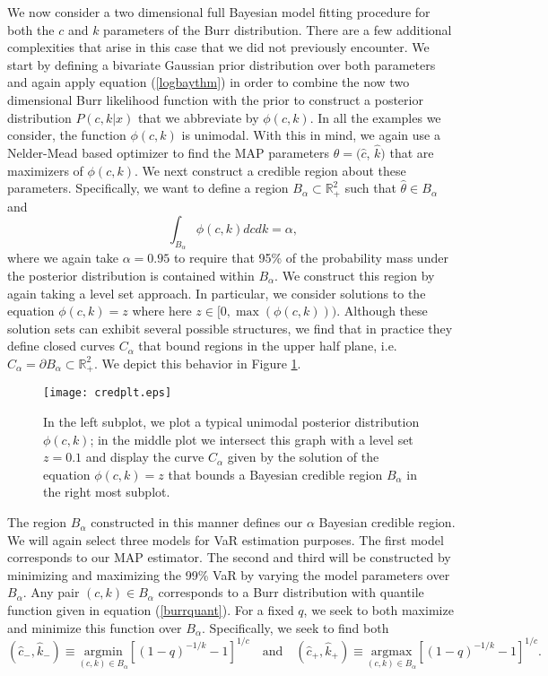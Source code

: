 \documentclass{amsart}
\begin{document}
We now consider a two dimensional full Bayesian model fitting procedure for 
both the $c$ and $k$ parameters of the Burr distribution.  There are a few additional 
complexities that arise in this case that we did not previously encounter. 
We start by defining a bivariate Gaussian prior distribution 
over both parameters and again apply equation (\ref{logbaythm}) in order to combine the now two dimensional 
Burr likelihood function with the prior to construct a 
posterior distribution $P(c,k|x)$ that we abbreviate by $\phi(c,k)$.  
In all the examples we consider, the function $\phi(c,k)$ is 
unimodal.  With this in mind, we again use a Nelder-Mead based optimizer to find the MAP 
parameters $\hat{\theta}=(\hat{c}$, $\hat{k})$ that are maximizers of $\phi(c,k)$.  We next 
construct a credible region about these parameters.  Specifically, we want 
to define a region $B_\alpha\subset\mathbb{R}^2_+$ such that $\hat{\theta}\in B_\alpha$ and 
%
\begin{equation}
    \int_{B_{\alpha}} \phi(c,k)dcdk = \alpha,
 \end{equation}
%
where we again take $\alpha=0.95$ to require that 95\% of the probability mass under the
posterior distribution is contained within $B_\alpha$. We construct this region by again taking a level set approach.  In particular, 
we consider solutions to the equation $\phi(c,k)=z$ where here 
$z\in [0,\max(\phi(c,k)))$.  Although these solution sets can exhibit several possible structures, 
we find that in practice they define closed curves $C_\alpha$ that 
bound regions in the upper half plane, i.e. $C_\alpha=\partial B_\alpha\subset\mathbb{R}^2_+$.
We depict this behavior in Figure \ref{typcrv}.
%
\begin{figure}[h!]
    \centering
    \texttt{[image: credplt.eps]}
    \caption{In the left subplot, we plot a typical unimodal posterior distribution $\phi(c,k)$; in the 
        middle plot we intersect this graph with a level set $z=0.1$ and display 
    the curve $C_\alpha$ given by the solution of the equation $\phi(c,k)=z$ that 
    bounds a Bayesian credible region $B_\alpha$  in the right most subplot.}
    \label{typcrv}
\end{figure}
%
The region $B_\alpha$ constructed in this manner defines our $\alpha$ Bayesian credible region. 
We will again select three models for VaR estimation purposes.  The first model corresponds to our 
MAP estimator.  The second and third will be constructed by minimizing and maximizing the 99\%
VaR by varying 
the model parameters over $B_\alpha$. Any pair $(c,k)\in B_\alpha$ corresponds to 
a Burr distribution with quantile function given in equation (\ref{burrquant}).  For a fixed 
$q$, we seek to both maximize and minimize this function over $B_\alpha$.  Specifically, 
we seek to find both
%
\begin{equation}
    (\hat{c}_-,\hat{k}_-) \equiv \underset{(c,k)\in B_\alpha}{\mathrm{argmin}} \left[(1-q)^{-1/k} - 1 \right]^{1/c}\quad 
    \mathrm{and}\quad
    (\hat{c}_+,\hat{k}_+) \equiv \underset{(c,k)\in B_\alpha}{\mathrm{argmax}} \left[(1-q)^{-1/k} - 1 \right]^{1/c}.
\end{equation}
%
\end{document}
